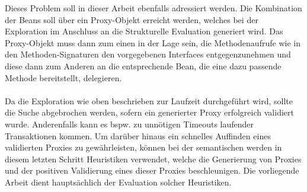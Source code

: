 Dieses Problem soll in dieser Arbeit ebenfalls adressiert werden. Die Kombination der Beans soll über ein Proxy-Objekt erreicht werden, welches bei der Exploration im Anschluss an die Strukturelle Evaluation generiert wird. Das Proxy-Objekt muss dann zum einen in der Lage sein, die Methodenaufrufe wie in den Methoden-Signaturen den vorgegebenen Interfaces entgegenzunehmen und diese dann zum Anderen an die entsprechende Bean, die eine dazu passende Methode bereitstellt, delegieren.
\\\\
Da die Exploration wie oben beschrieben zur Laufzeit durchgeführt wird, sollte die Suche abgebrochen werden, sofern ein generierter Proxy erfolgreich validiert wurde. Anderenfalls kann es bspw. zu unnötigen Timeouts laufender Transaktionen kommen. Um darüber hinaus ein schnelles Auffinden eines validierten Proxies zu gewährleisten, können bei der semantischen werden in diesem letzten Schritt Heuristiken verwendet, welche die Generierung von Proxies und der positiven Validierung eines dieser Proxies beschleunigen. Die vorliegende Arbeit dient hauptsächlich der Evaluation solcher Heuristiken.
